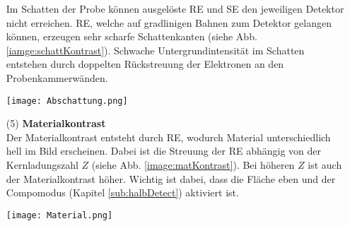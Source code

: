 \begin{itemize}
    Im Schatten der Probe können ausgelöste RE und SE den jeweiligen Detektor nicht erreichen. RE, welche auf gradlinigen Bahnen zum Detektor gelangen können, erzeugen sehr scharfe Schattenkanten (siehe Abb. \ref{iamge:schattKontrast}). Schwache Untergrundintensität im Schatten entstehen durch doppelten Rückstreuung der Elektronen an den Probenkammerwänden.
    \begin{center}
        \texttt{[image: Abschattung.png]}
        \label{iamge:schattKontrast}
    \end{center}
    \newpage
    \item[(5)]\textbf{Materialkontrast}\\
    Der Materialkontrast entsteht durch RE, wodurch Material unterschiedlich hell im Bild erscheinen. Dabei ist die Streuung der RE abhängig von der Kernladungszahl $Z$ (siehe Abb. \ref{image:matKontrast}). Bei höheren $Z$ ist auch der Materialkontrast höher. Wichtig ist dabei, dass die Fläche eben und der Compomodus (Kapitel \ref{sub:halbDetect}) aktiviert ist.
    \begin{center}
        \texttt{[image: Material.png]}
        \label{image:matKontrast}
    \end{center}
\end{itemize}